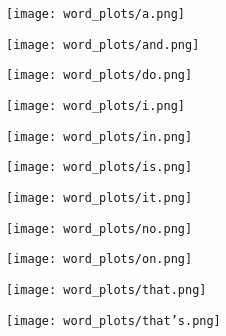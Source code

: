 \documentclass{article}
\theoremstyle{plain}
\theoremstyle{definition}
\theoremstyle{remark}
\numberwithin{equation}{section}
\begin{document}
\begin{figure}
    \centering
    \begin{subfigure}[b]{0.3\textwidth}
        \texttt{[image: word\_plots/a.png]}
        \label{fig:a}
    \end{subfigure}
    \begin{subfigure}[b]{0.3\textwidth}
        \texttt{[image: word\_plots/and.png]}
        \label{fig:and}
    \end{subfigure}
    \begin{subfigure}[b]{0.3\textwidth}
        \texttt{[image: word\_plots/do.png]}
        \label{fig:do}
    \end{subfigure}
    \begin{subfigure}[b]{0.3\textwidth}
        \texttt{[image: word\_plots/i.png]}
        \label{fig:i}
    \end{subfigure}
    \begin{subfigure}[b]{0.3\textwidth}
        \texttt{[image: word\_plots/in.png]}
        \label{fig:in}
    \end{subfigure}
    \begin{subfigure}[b]{0.3\textwidth}
        \texttt{[image: word\_plots/is.png]}
        \label{fig:is}
    \end{subfigure}
    \begin{subfigure}[b]{0.3\textwidth}
        \texttt{[image: word\_plots/it.png]}
        \label{fig:it}
    \end{subfigure}
    \begin{subfigure}[b]{0.3\textwidth}
        \texttt{[image: word\_plots/no.png]}
        \label{fig:no}
    \end{subfigure}
    \begin{subfigure}[b]{0.3\textwidth}
        \texttt{[image: word\_plots/on.png]}
        \label{fig:on}
    \end{subfigure}
    \begin{subfigure}[b]{0.3\textwidth}
        \texttt{[image: word\_plots/that.png]}
        \label{fig:that}
    \end{subfigure}
    \begin{subfigure}[b]{0.3\textwidth}
        \texttt{[image: word\_plots/that's.png]}
        \label{fig:thats}
    \end{subfigure}
    \begin{subfigure}[b]{0.3\textwidth}

\end{subfigure}
\end{figure}
\end{document}
